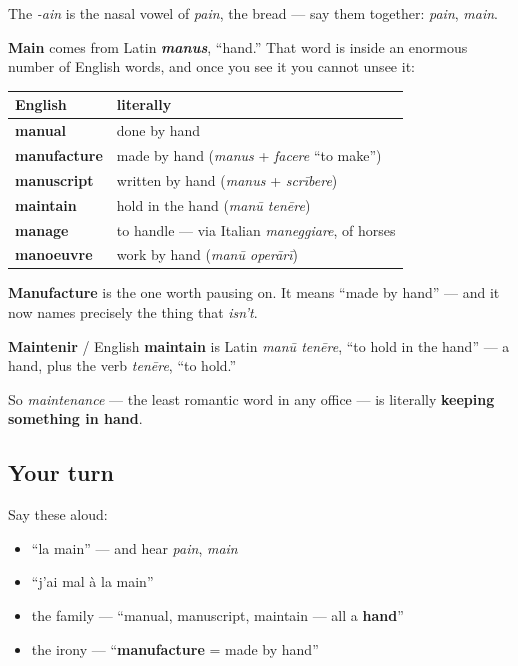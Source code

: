 The \emph{-ain} is the nasal vowel of \emph{pain}, the bread — say them together: \emph{pain}, \emph{main}.

\begin{cousinweb}
\textbf{Main} comes from Latin \emph{\textbf{manus}}, \textquotedblleft{}hand.\textquotedblright{} That word is inside an enormous number of English words, and once you see it you cannot unsee it:

\noindent
\begin{tabularx}{\linewidth}{@{}>{\raggedright\arraybackslash}X>{\raggedright\arraybackslash}X@{}}
\toprule
\textbf{English} & \textbf{literally} \\
\midrule
\textbf{manual} & done by hand \\
\textbf{manufacture} & made by hand (\emph{manus} + \emph{facere} \textquotedblleft{}to make\textquotedblright{}) \\
\textbf{manuscript} & written by hand (\emph{manus} + \emph{scrībere}) \\
\textbf{maintain} & hold in the hand (\emph{manū tenēre}) \\
\textbf{manage} & to handle — via Italian \emph{maneggiare}, of horses \\
\textbf{manoeuvre} & work by hand (\emph{manū operārī}) \\
\bottomrule
\end{tabularx}

\textbf{Manufacture} is the one worth pausing on. It means \textquotedblleft{}made by hand\textquotedblright{} — and it now names precisely the thing that \emph{isn't}.
\end{cousinweb}

\begin{cousinweb}
\textbf{Maintenir} / English \textbf{maintain} is Latin \emph{manū tenēre}, \textquotedblleft{}to hold in the hand\textquotedblright{} — a hand, plus the verb \emph{tenēre}, \textquotedblleft{}to hold.\textquotedblright{}

So \emph{maintenance} — the least romantic word in any office — is literally \textbf{keeping something in hand}.
\end{cousinweb}

\subsection*{Your turn}
Say these aloud:

\begin{itemize}
\raggedright
  \item \textquotedblleft{}la main\textquotedblright{} — and hear \emph{pain}, \emph{main}
  \item \textquotedblleft{}j'ai mal à la main\textquotedblright{}
  \item the family — \textquotedblleft{}manual, manuscript, maintain — all a \textbf{hand}\textquotedblright{}
  \item the irony — \textquotedblleft{}\textbf{manufacture} = made by hand\textquotedblright{}
\end{itemize}

